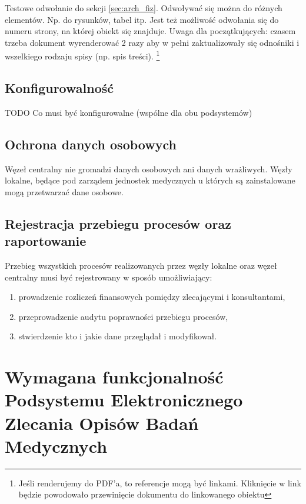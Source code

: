 \documentclass[a4paper]{article}
\begin{document}
Testowe odwołanie do sekcji \ref{sec:arch_fiz}. Odwoływać się można do różnych elementów. Np. do rysunków, tabel itp. Jest też możliwość odwołania się do numeru strony, na której obiekt się znajduje. Uwaga dla początkujących: czasem trzeba dokument wyrenderować 2 razy aby w pełni zaktualizowały się odnośniki i wszelkiego rodzaju spisy (np. spis treści).
\footnote{Jeśli renderujemy do PDF'a, to referencje mogą być linkami. Kliknięcie w link będzie powodowało przewinięcie dokumentu do linkowanego obiektu}

\subsection{Konfigurowalność}

TODO Co musi być konfigurowalne (wspólne dla obu podsystemów)

\subsection{Ochrona danych osobowych}

Węzeł centralny nie gromadzi danych osobowych ani danych wrażliwych. Węzły lokalne, będące pod zarządem jednostek medycznych u których są zainstalowane mogą przetwarzać dane osobowe.

\subsection{Rejestracja przebiegu procesów oraz raportowanie}

Przebieg wszystkich procesów realizowanych przez węzły lokalne oraz węzeł 
centralny musi być rejestrowany w sposób umożliwiający: 
\begin{enumerate}
  \item prowadzenie rozliczeń finansowych pomiędzy zlecającymi i konsultantami,
  \item przeprowadzenie audytu poprawności przebiegu procesów,
  \item stwierdzenie kto i jakie dane przeglądał i modyfikował.
\end{enumerate}

\section{Wymagana funkcjonalność Podsystemu Elektronicznego Zlecania Opisów Badań Medycznych}
\end{document}
